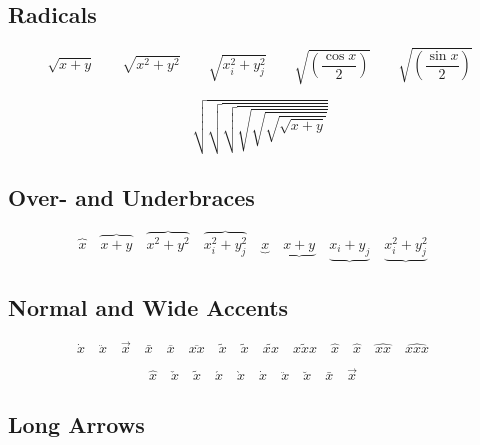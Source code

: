 \documentclass[12pt, a4paper, oneside]{article}
\theoremstyle{Plain}
\theoremstyle{Definition}
\theoremstyle{Remark}
\begin{document}
\begin{appendix}
\subsection{Radicals \showfamily}

\begin{displaymath}
  \sqrt{x+y} \qquad \sqrt{x^{2}+y^{2}} \qquad
  \sqrt{x_{i}^{2}+y_{j}^{2}} \qquad
  \sqrt{\left(\frac{\cos x}{2}\right)} \qquad
  \sqrt{\left(\frac{\sin x}{2}\right)}
\end{displaymath}

\begingroup
\delimitershortfall-1pt
\begin{displaymath}
  \sqrt{\sqrt{\sqrt{\sqrt{\sqrt{\sqrt{\sqrt{x+y}}}}}}}
\end{displaymath}
\endgroup %


\subsection{Over- and Underbraces \showfamily}

\begin{displaymath}
  \overbrace{x} \quad
  \overbrace{x+y} \quad
  \overbrace{x^{2}+y^{2}} \quad
  \overbrace{x_{i}^{2}+y_{j}^{2}} \quad
  \underbrace{x} \quad
  \underbrace{x+y} \quad
  \underbrace{x_{i}+y_{j}} \quad
  \underbrace{x_{i}^{2}+y_{j}^{2}} \quad
\end{displaymath}


\subsection{Normal and Wide Accents \showfamily}

\begin{displaymath}
  \dot{x} \quad
  \ddot{x} \quad
  \vec{x} \quad
  \bar{x} \quad
  \overline{x} \quad
  \overline{xx} \quad
  \tilde{x} \quad
  \widetilde{x} \quad
  \widetilde{xx} \quad
  \widetilde{xxx} \quad
  \hat{x} \quad
  \widehat{x} \quad
  \widehat{xx} \quad
  \widehat{xxx} \quad
\end{displaymath}

\begin{displaymath}
  \hat{x} \quad
  \check{x} \quad
  \tilde{x} \quad
  \acute{x} \quad
  \grave{x} \quad
  \dot{x} \quad
  \ddot{x} \quad
  \breve{x} \quad
  \bar{x} \quad
  \vec{x} \quad
\end{displaymath}


\subsection{Long Arrows \showfamily}


\end{appendix}
\end{document}

